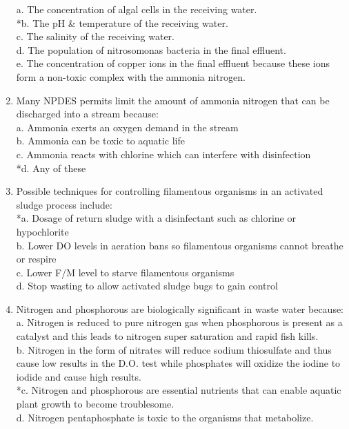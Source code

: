 \begin{enumerate}
a. The concentration of algal cells in the receiving water. \\
*b. The pH \& temperature of the receiving water. \\
c. The salinity of the receiving water. \\
d. The population of nitrosomonas bacteria in the final effluent. \\
e. The concentration of copper ions in the final effluent because these ions form a non-toxic complex with the ammonia nitrogen. 

\item Many NPDES permits limit the amount of ammonia nitrogen that can be discharged into a stream because: \\

a. Ammonia exerts an oxygen demand in the stream \\
b. Ammonia can be toxic to aquatic life \\
c. Ammonia reacts with chlorine which can interfere with disinfection \\
*d. Any of these 

\item Possible techniques for controlling filamentous organisms in an activated sludge process include: \\

*a. Dosage of return sludge with a disinfectant such as chlorine or hypochlorite \\
b. Lower DO levels in aeration bans so filamentous organisms cannot breathe or respire \\
c. Lower F/M level to starve filamentous organisms \\
d. Stop wasting to allow activated sludge bugs to gain control 

\item Nitrogen and phosphorous are biologically significant in waste water because: \\

a. Nitrogen is reduced to pure nitrogen gas when phosphorous is present as a catalyst and this leads to nitrogen super saturation and rapid fish kills. \\
b. Nitrogen in the form of nitrates will reduce sodium thiosulfate and thus cause low results in the D.O. test while phosphates will oxidize the iodine to iodide and cause high results. \\
*c. Nitrogen and phosphorous are essential nutrients that can enable aquatic plant growth to become troublesome. \\
d. Nitrogen pentaphosphate is toxic to the organisms that metabolize. 


\end{enumerate}
